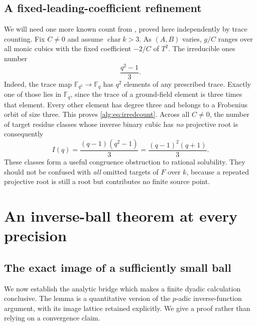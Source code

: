 \documentclass[11pt]{article}
\numberwithin{equation}{section}
\theoremstyle{plain}
\theoremstyle{plain}
\theoremstyle{plain}
\theoremstyle{definition}
\theoremstyle{definition}
\theoremstyle{definition}
\theoremstyle{remark}
\newcommand{\F}{\mathbb F}\newcommand{\A}{\mathbb A}\newcommand{\PP}{\mathbb P}
\begin{document}
\subsection{A fixed-leading-coefficient refinement}
We will need one more known count from \cite{finitefield}, proved here
independently by trace counting. Fix $C\ne0$ and assume
$\operatorname{char}k>3$. As $(A,B)$ varies, $g/C$ ranges over all monic
cubics with the fixed coefficient $-2/C$ of $T^2$. The irreducible ones
number
\begin{equation}\label{alg:eq:irredcount}
 \frac{q^2-1}{3}.
\end{equation}
Indeed, the trace map $\F_{q^3}\to\F_q$ has $q^2$ elements of any prescribed
trace. Exactly one of those lies in $\F_q$, since the trace of a ground-field
element is three times that element. Every other element has degree three
and belongs to a Frobenius orbit of size three. This proves
\eqref{alg:eq:irredcount}.
Across all $C\ne0$, the number of target residue classes whose inverse
binary cubic has \emph{no} projective root is consequently
\begin{equation}\label{alg:eq:Iq}
 I(q)=\frac{(q-1)(q^2-1)}3
     =\frac{(q-1)^2(q+1)}3.
\end{equation}
These classes form a useful congruence obstruction to rational solubility.
They should not be confused with \emph{all} omitted targets of $F$ over
$k$, because a repeated projective root is still a root but contributes
no finite source point.

\section{An inverse-ball theorem at every precision}\label{alg:sec:ball}

\subsection{The exact image of a sufficiently small ball}
We now establish the analytic bridge which makes a finite dyadic
calculation conclusive. The lemma is a quantitative version of the
$p$-adic inverse-function argument, with its image lattice retained
explicitly. We give a proof rather than relying on a convergence claim.
\end{document}
